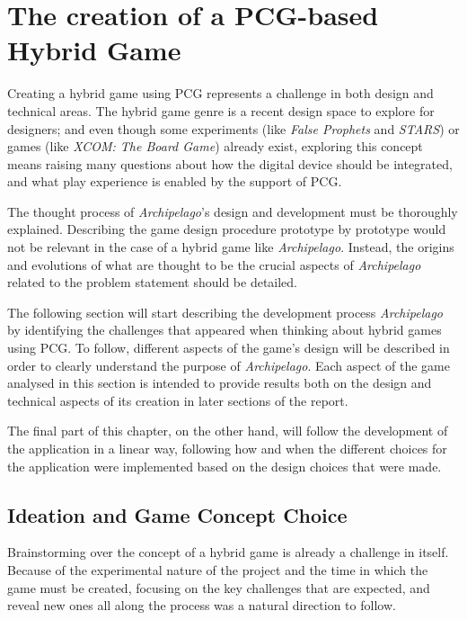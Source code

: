 \chapter{The creation of a PCG-based Hybrid Game}
\label{sec:dev}
Creating a hybrid game using PCG represents a challenge in both design and technical areas. The hybrid game genre is a recent design space to explore for designers; and even though some experiments (like \textit{False Prophets} and \textit{STARS}) or games (like \textit{XCOM: The Board Game}) already exist, exploring this concept means raising many questions about how the digital device should be integrated, and what play experience is enabled by the support of PCG.

The thought process of \textit{Archipelago}'s design and development must be thoroughly explained. Describing the game design procedure prototype by prototype would not be relevant in the case of a hybrid game like \textit{Archipelago}. Instead, the origins and evolutions of what are thought to be the crucial aspects of \textit{Archipelago} related to the problem statement should be detailed.

The following section will start describing the development process \textit{Archipelago} by identifying the challenges that appeared when thinking about hybrid games using PCG. To follow, different aspects of the game's design will be described in order to clearly understand the purpose of \textit{Archipelago}. Each aspect of the game analysed in this section is intended to provide results both on the design and technical aspects of its creation in later sections of the report.

The final part of this chapter, on the other hand,  will follow the development of the application in a linear way, following how and when the different choices for the application were implemented based on the design choices that were made.
\section{Ideation and Game Concept Choice}
Brainstorming over the concept of a hybrid game is already a challenge in itself. Because of the experimental nature of the project and the time in which the game must be created, focusing on the key challenges that are expected, and reveal new ones all along the process was a natural direction to follow.
